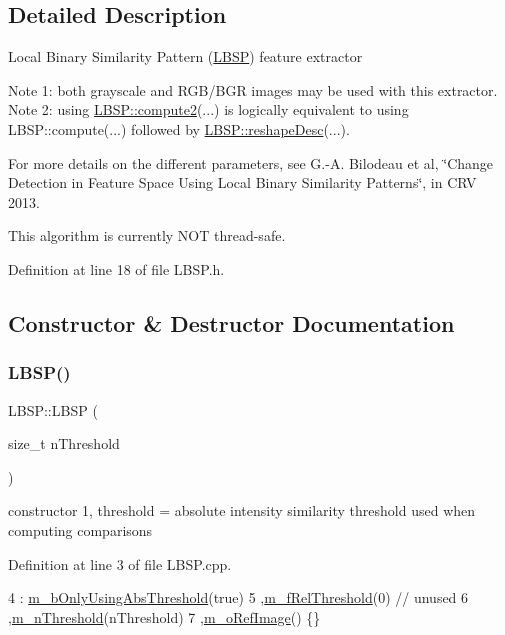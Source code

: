 \subsection{Detailed Description}
Local Binary Similarity Pattern (\mbox{\hyperlink{class_l_b_s_p}{L\+B\+SP}}) feature extractor

Note 1\+: both grayscale and R\+G\+B/\+B\+GR images may be used with this extractor. Note 2\+: using \mbox{\hyperlink{class_l_b_s_p_ab61148341758dbc004660761bca04f84}{L\+B\+S\+P\+::compute2}}(...) is logically equivalent to using L\+B\+S\+P\+::compute(...) followed by \mbox{\hyperlink{class_l_b_s_p_a555e2f241fbdac2ebb1eab31482f5f05}{L\+B\+S\+P\+::reshape\+Desc}}(...).

For more details on the different parameters, see G.-\/A. Bilodeau et al, \char`\"{}\+Change Detection in Feature Space Using Local
\+Binary Similarity Patterns\char`\"{}, in C\+RV 2013.

This algorithm is currently N\+OT thread-\/safe. 

Definition at line 18 of file L\+B\+S\+P.\+h.



\subsection{Constructor \& Destructor Documentation}
\mbox{\label{class_l_b_s_p_ae8297d81cf95b0e5333bf2e88b396a23}} 
\subsubsection{\texorpdfstring{L\+B\+S\+P()}{LBSP()}\hspace{0.1cm}{\footnotesize\ttfamily [1/2]}}
{\footnotesize\ttfamily L\+B\+S\+P\+::\+L\+B\+SP (\begin{DoxyParamCaption}\item[{size\+\_\+t}]{n\+Threshold }\end{DoxyParamCaption})}



constructor 1, threshold = absolute intensity \textquotesingle{}similarity\textquotesingle{} threshold used when computing comparisons 



Definition at line 3 of file L\+B\+S\+P.\+cpp.


\begin{DoxyCode}
4     :    \mbox{\hyperlink{class_l_b_s_p_a5f49537c70502b73f32038218a4f8371}{m\_bOnlyUsingAbsThreshold}}(\textcolor{keyword}{true})
5         ,\mbox{\hyperlink{class_l_b_s_p_a99fbb83c842782bb5621a43efb7580d5}{m\_fRelThreshold}}(0) \textcolor{comment}{// unused}
6         ,\mbox{\hyperlink{class_l_b_s_p_aa1c90eb308a5ff277df09c4da186693a}{m\_nThreshold}}(nThreshold)
7         ,\mbox{\hyperlink{class_l_b_s_p_a8c5ccb37124c8fa457db0ba9dbe28c18}{m\_oRefImage}}() \{\}
\end{DoxyCode}
\mbox{\label{class_l_b_s_p_ab702ec2748fc5bac6e258370a089c270}} 

